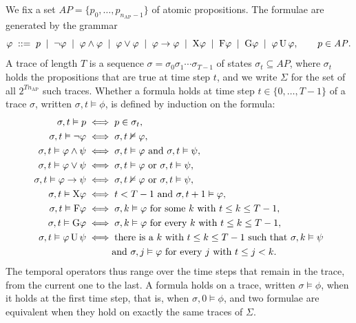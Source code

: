 \documentclass[titlepage,a4paper,11pt]{report}
\newenvironment{RSnewblock}{\par\color{blue!65!black}}{\par}
\begin{document}
        \begin{RSnewblock}
    We fix a set $\mathit{AP}=\{p_0,\dots,p_{n_{\text{AP}}-1}\}$ of atomic propositions. The formulae are generated by the grammar
    \begin{equation*}
        \varphi\;::=\;p\;\mid\;\neg\varphi\;\mid\;\varphi\land\varphi\;\mid\;\varphi\lor\varphi\;\mid\;\varphi\to\varphi\;\mid\;\text{X}\varphi\;\mid\;\text{F}\varphi\;\mid\;\text{G}\varphi\;\mid\;\varphi\,\text{U}\,\varphi,
        \qquad p\in\mathit{AP}.
    \end{equation*}
    A trace of length $T$ is a sequence $\sigma=\sigma_0\sigma_1\cdots\sigma_{T-1}$ of states $\sigma_t\subseteq\mathit{AP}$, where $\sigma_t$ holds the propositions that are true at time step $t$, and we write $\Sigma$ for the set of all $2^{Tn_{\text{AP}}}$ such traces. Whether a formula holds at time step $t\in\{0,\dots,T-1\}$ of a trace $\sigma$, written $\sigma,t\vDash\phi$, is defined by induction on the formula:
    \begin{equation}\label{eq:ltlf_semantics}
    \begin{aligned}
        \sigma,t\vDash p &\iff p\in\sigma_t,\\
        \sigma,t\vDash\neg\phi &\iff \sigma,t\nvDash\phi,\\
        \sigma,t\vDash\phi\land\psi &\iff \sigma,t\vDash\phi\text{ and }\sigma,t\vDash\psi,\\
        \sigma,t\vDash\phi\lor\psi &\iff \sigma,t\vDash\phi\text{ or }\sigma,t\vDash\psi,\\
        \sigma,t\vDash\phi\to\psi &\iff \sigma,t\nvDash\phi\text{ or }\sigma,t\vDash\psi,\\
        \sigma,t\vDash\X\phi &\iff t<T-1\text{ and }\sigma,t+1\vDash\phi,\\
        \sigma,t\vDash\F\phi &\iff \sigma,k\vDash\phi\text{ for some }k\text{ with }t\le k\le T-1,\\
        \sigma,t\vDash\G\phi &\iff \sigma,k\vDash\phi\text{ for every }k\text{ with }t\le k\le T-1,\\
        \sigma,t\vDash\phi\,\Un\,\psi &\iff \text{there is a }k\text{ with }t\le k\le T-1\text{ such that }\sigma,k\vDash\psi\\
        &\phantom{\iff{}}\text{and }\sigma,j\vDash\phi\text{ for every }j\text{ with }t\le j<k.
    \end{aligned}
    \end{equation}
    The temporal operators thus range over the time steps that remain in the trace, from the current one to the last. A formula holds on a trace, written $\sigma\vDash\phi$, when it holds at the first time step, that is, when $\sigma,0\vDash\phi$, and two formulae are equivalent when they hold on exactly the same traces of $\Sigma$.


\end{RSnewblock}
\end{document}
